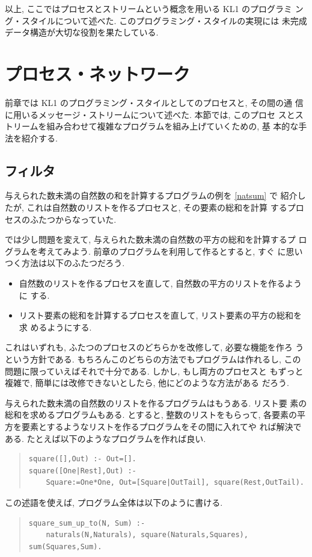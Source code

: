 \documentclass[a4,titlepage]{jsreport}
\newenvironment{program}{\begin{quote}}{\end{quote}}
\begin{document}
以上, ここではプロセスとストリームという概念を用いる KL1 のプログラミ
ング・スタイルについて述べた.  このプログラミング・スタイルの実現には
未完成データ構造が大切な役割を果たしている.

\section{プロセス・ネットワーク}
前章では KL1 のプログラミング・スタイルとしてのプロセスと, その間の通
信に用いるメッセージ・ストリームについて述べた.  本節では, このプロセ
スとストリームを組み合わせて複雑なプログラムを組み上げていくための, 基
本的な手法を紹介する.

\subsection{フィルタ}
与えられた数未満の自然数の和を計算するプログラムの例を \ref{natsum} で
紹介したが, これは自然数のリストを作るプロセスと, その要素の総和を計算
するプロセスのふたつからなっていた.

では少し問題を変えて, 与えられた数未満の自然数の平方の総和を計算するプ
ログラムを考えてみよう.  前章のプログラムを利用して作るとすると, すぐ
に思いつく方法は以下のふたつだろう.
\begin{itemize}
\item
自然数のリストを作るプロセスを直して, 自然数の平方のリストを作るように
する.
\item
リスト要素の総和を計算するプロセスを直して, リスト要素の平方の総和を求
めるようにする.
\end{itemize}
これはいずれも, ふたつのプロセスのどちらかを改修して, 必要な機能を作ろ
うという方針である.  もちろんこのどちらの方法でもプログラムは作れるし, 
この問題に限っていえばそれで十分である.  しかし, もし両方のプロセスと
もずっと複雑で, 簡単には改修できないとしたら, 他にどのような方法がある
だろう.

与えられた数未満の自然数のリストを作るプログラムはもうある.  リスト要
素の総和を求めるプログラムもある.  とすると, 整数のリストをもらって, 
各要素の平方を要素とするようなリストを作るプログラムをその間に入れてや
れば解決である.  たとえば以下のようなプログラムを作れば良い.
\begin{program}
\begin{Verbatim}[baselinestretch=0.8]
square([],Out) :- Out=[].
square([One|Rest],Out) :-
    Square:=One*One, Out=[Square|OutTail], square(Rest,OutTail).
\end{Verbatim}
\end{program}
この述語を使えば, プログラム全体は以下のように書ける.
\begin{program}
\begin{Verbatim}[baselinestretch=0.8]
square_sum_up_to(N, Sum) :-
    naturals(N,Naturals), square(Naturals,Squares), sum(Squares,Sum).
\end{Verbatim}
\end{program}
\end{document}
